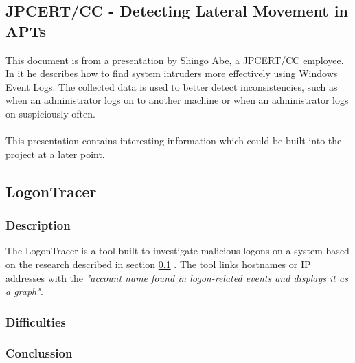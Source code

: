 \subsection{JPCERT/CC - Detecting Lateral Movement in APTs} \label{DetectingLateral}
This document is from a presentation by Shingo Abe, a JPCERT/CC employee. In it he describes how to find system intruders more effectively using Windows Event Logs. The collected data is used to better detect inconsistencies, such as when an administrator logs on to another machine or when an administrator logs on suspiciously often. 
\\\\
This presentation contains interesting information which could be built into the project at a later point.

\subsection{LogonTracer}
\subsubsection{Description}
The LogonTracer is a tool built to investigate malicious logons on a system based on the research described in section \ref{DetectingLateral} . The tool links hostnames or IP addresses with the \textit{"account name found in logon-related events and displays it as a graph"}. \cite{LogonTracer}

\subsubsection{Difficulties}

\subsubsection{Conclussion}


